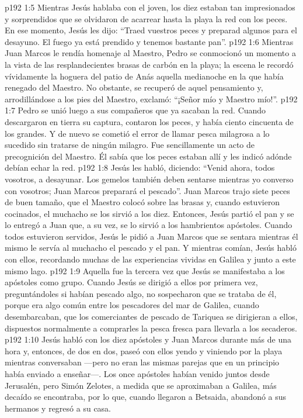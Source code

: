 \vs p192 1:5 Mientras Jesús hablaba con el joven, los diez estaban tan impresionados y sorprendidos que se olvidaron de acarrear hasta la playa la red con los peces. En ese momento, Jesús les dijo: “Traed vuestros peces y preparad algunos para el desayuno. El fuego ya está prendido y tenemos bastante pan”.
\vs p192 1:6 Mientras Juan Marcos le rendía homenaje al Maestro, Pedro se conmocionó un momento a la vista de las resplandecientes brasas de carbón en la playa; la escena le recordó vívidamente la hoguera del patio de Anás aquella medianoche en la que había renegado del Maestro. No obstante, se recuperó de aquel pensamiento y, arrodillándose a los pies del Maestro, exclamó: “¡Señor mío y Maestro mío!”.
\vs p192 1:7 Pedro se unió luego a sus compañeros que ya sacaban la red. Cuando descargaron en tierra su captura, contaron los peces, y había ciento cincuenta de los grandes. Y de nuevo se cometió el error de llamar pesca milagrosa a lo sucedido sin tratarse de ningún milagro. Fue sencillamente un acto de precognición del Maestro. Él sabía que los peces estaban allí y les indicó adónde debían echar la red.
\vs p192 1:8 Jesús les habló, diciendo: “Venid ahora, todos vosotros, a desayunar. Los gemelos también deben sentarse mientras yo converso con vosotros; Juan Marcos preparará el pescado”. Juan Marcos trajo siete peces de buen tamaño, que el Maestro colocó sobre las brasas y, cuando estuvieron cocinados, el muchacho se los sirvió a los diez. Entonces, Jesús partió el pan y se lo entregó a Juan que, a su vez, se lo sirvió a los hambrientos apóstoles. Cuando todos estuvieron servidos, Jesús le pidió a Juan Marcos que se sentara mientras él mismo le servía al muchacho el pescado y el pan. Y mientras comían, Jesús habló con ellos, recordando muchas de las experiencias vividas en Galilea y junto a este mismo lago.
\vs p192 1:9 \pc Aquella fue la tercera vez que Jesús se manifestaba a los apóstoles como grupo. Cuando Jesús se dirigió a ellos por primera vez, preguntándoles si habían pescado algo, no sospecharon que se trataba de él, porque era algo común entre los pescadores del mar de Galilea, cuando desembarcaban, que los comerciantes de pescado de Tariquea se dirigieran a ellos, dispuestos normalmente a comprarles la pesca fresca para llevarla a los secaderos.
\vs p192 1:10 \pc Jesús habló con los diez apóstoles y Juan Marcos durante más de una hora y, entonces, de dos en dos, paseó con ellos yendo y viniendo por la playa mientras conversaban ---pero no eran las mismas parejas que en un principio había enviado a enseñar---. Los once apóstoles habían venido juntos desde Jerusalén, pero Simón Zelotes, a medida que se aproximaban a Galilea, más decaído se encontraba, por lo que, cuando llegaron a Betsaida, abandonó a sus hermanos y regresó a su casa.
